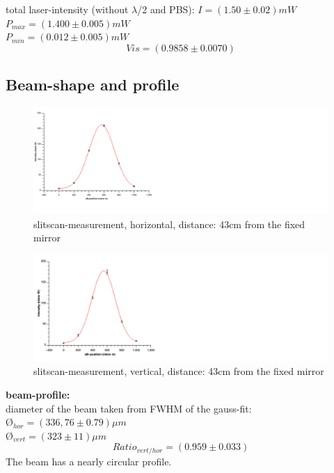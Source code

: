 \documentclass[12pt,a4paper]{article}
\begin{document}
\begin{multicols}{2}
\noindent total laser-intensity (without $\lambda$/2 and PBS): $I = (1.50\pm 0.02)mW$\\
$P_{max} = (1.400 \pm 0.005)mW$\\
$P_{min} = (0.012 \pm 0.005)mW$\\
$$Vis = (0.9858 \pm 0.0070)$$



\subsection{Beam-shape and profile}

\begin{figure}[H]
 \centering
 \includegraphics[scale=0.46]{./figures/beamprofile_horiz_43cm.png}
 \caption{slitscan-measurement, horizontal, distance: 43cm from the fixed mirror}
 \label{fig:shape_measure}
\end{figure}

\begin{figure}[H]
 \centering
 \includegraphics[scale=0.46]{./figures/beamprofile_vertic_43cm.png}
 \caption{slitscan-measurement, vertical, distance: 43cm from the fixed mirror}
 \label{fig:shape_measure}
\end{figure}


\noindent \textbf{beam-profile:}\\
diameter of the beam taken from FWHM of the gauss-fit:\\
\O$_{hor} = (336,76 \pm 0.79) \mu m$\\
\O$_{vert} = (323 \pm 11) \mu m$
$$Ratio_{vert/hor}=(0.959 \pm 0.033)$$
The beam has a nearly circular profile.\\


\end{multicols}
\end{document}
